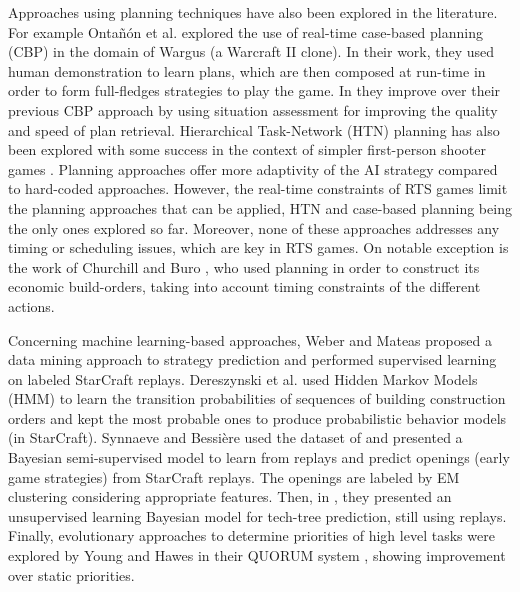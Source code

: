 \documentclass[journal]{IEEEtran}
\begin{document}
Approaches using planning techniques have also been explored in the literature. For example Onta\~{n}\'{o}n et al. \cite{CBR_Planning} explored the use of real-time case-based planning (CBP) in the domain of Wargus (a Warcraft II clone). In their work, they used human demonstration to learn plans, which are then composed at run-time in order to form full-fledges strategies to play the game. In \cite{PlanRetrieval} they improve over  their previous CBP approach by using situation assessment for improving the quality and speed of plan retrieval. Hierarchical Task-Network (HTN) planning has also been explored with some success in the context of simpler first-person shooter games \cite{HTNPlanning}. Planning approaches offer more adaptivity of the AI strategy compared to hard-coded approaches. However, the real-time constraints of RTS games limit the planning approaches that can be applied, HTN and case-based planning being the only ones explored so far. Moreover, none of these approaches addresses any timing or scheduling issues, which are key in RTS games. On notable exception is the work of Churchill and Buro \cite{churchill2011build}, who used planning in order to construct its economic build-orders, taking into account timing constraints of the different actions.

Concerning machine learning-based approaches, Weber and Mateas \cite{WeberCig09} proposed a data mining approach to strategy prediction and performed supervised learning on labeled StarCraft replays. Dereszynski et al. \cite{HMMstrat_RTS_AIIDE11} used Hidden Markov Models (HMM) to learn the transition probabilities of sequences of building construction orders and kept the most probable ones to produce probabilistic behavior models (in StarCraft). Synnaeve and Bessi\`{e}re \cite{SynnaeveOpeningCig11} used the dataset of \cite{WeberCig09} and presented a Bayesian semi-supervised model to learn from replays and predict openings (early game strategies) from StarCraft replays. The openings are labeled by EM clustering considering appropriate features. Then, in \cite{SynnaeveAIIDE11}, they presented an unsupervised learning Bayesian model for tech-tree prediction, still using replays. %
Finally, evolutionary approaches to determine priorities of high level tasks were explored by Young and Hawes in their QUORUM system \cite{young2012evolutionary}, showing improvement over static priorities.
\end{document}
